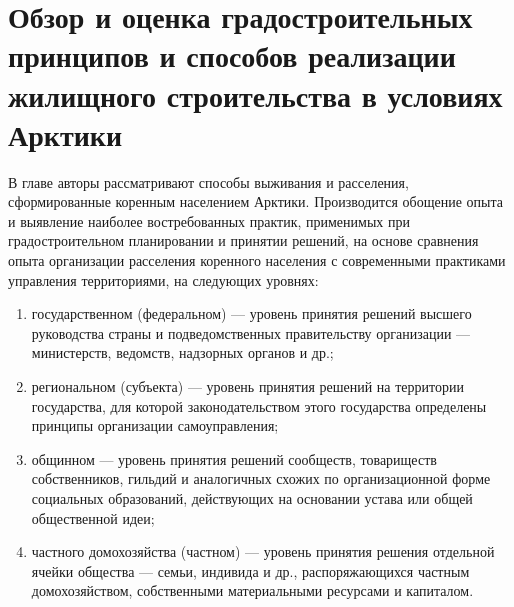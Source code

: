 \chapter{Обзор и оценка градостроительных принципов и способов реализации жилищного строительства в условиях Арктики}
В главе авторы рассматривают способы выживания и расселения, сформированные коренным населением Арктики.
Производится обощение опыта и выявление наиболее востребованных практик, применимых при градостроительном планировании и принятии решений,
на основе сравнения опыта организации расселения коренного населения с современными практиками управления территориями, на следующих уровнях:
\begin{enumerate}[1)]
    \item государственном (федеральном) — уровень принятия решений высшего руководства страны и подведомственных правительству организации — министерств, ведомств, надзорных органов и др.;
    \item региональном (субъекта) — уровень принятия решений на территории государства, для которой законодательством этого государства определены принципы организации самоуправления;
    \item общинном — уровень принятия решений сообществ, товариществ собственников, гильдий и аналогичных схожих по организационной форме
    социальных образований, действующих на основании устава или общей общественной идеи;
    \item частного домохозяйства (частном) — уровень принятия решения отдельной ячейки общества — семьи, индивида и др., распоряжающихся частным
    домохозяйством, собственными материальными ресурсами и капиталом.
\end{enumerate}



